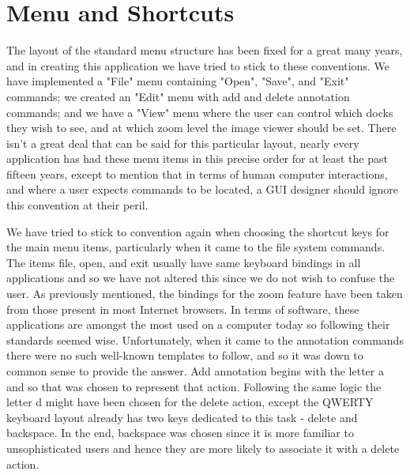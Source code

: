 \section{Menu and Shortcuts}
The layout of the standard menu structure has been fixed for a great many years, and in creating this application we have tried to stick to these conventions.  We have implemented a "File" menu containing "Open", "Save", and "Exit" commands; we created an "Edit"  menu with add and delete annotation commands; and we have a "View" menu where the user can control which docks they wish to see, and at which zoom level the image viewer should be set.  There isn’t a great deal that can be said for this particular layout, nearly every application has had these menu items in this precise order for at least the past fifteen years, except to mention that in terms of human computer interactions, and where a user expects commands to be located, a GUI designer should ignore this convention at their peril.

We have tried to stick to convention again when choosing the shortcut keys for the main menu items, particularly when it came to the file system commands.  The items file, open, and exit usually have same keyboard bindings in all applications and so we have not altered this since we do not wish to confuse the user.  As previously mentioned, the bindings for the zoom feature have been taken from those present in most Internet browsers.  In terms of software, these applications are amongst the most used on a computer today so following their standards seemed wise.  Unfortunately, when it came to the annotation commands there were no such well-known templates to follow, and so it was down to common sense to provide the answer.  Add annotation begins with the letter a and so that was chosen to represent that action.  Following the same logic the letter d might have been chosen for the delete action, except the QWERTY keyboard layout already has two keys dedicated to this task - delete and backspace.  In the end, backspace was chosen since it is more familiar to unsophisticated users and hence they are more likely to associate it with a delete action.
